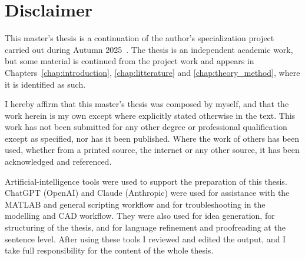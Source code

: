 \chapter*{Disclaimer}
\label{front:discl}

This master's thesis is a continuation of the author's specialization project carried out during Autumn 2025~\cite{Leonsen2025}. The thesis is an independent academic work, but some material is continued from the project work and appears in Chapters~\ref{chap:introduction}, \ref{chap:litterature} and \ref{chap:theory_method}, where it is identified as such.

I hereby affirm that this master's thesis was composed by myself, and that the work herein is my own except where explicitly stated otherwise in the text. This work has not been submitted for any other degree or professional qualification except as specified, nor has it been published. Where the work of others has been used, whether from a printed source, the internet or any other source, it has been acknowledged and referenced.

Artificial-intelligence tools were used to support the preparation of this thesis. ChatGPT (OpenAI) and Claude (Anthropic) were used for assistance with the MATLAB and general scripting workflow and for troubleshooting in the modelling and CAD workflow. They were also used for idea generation, for structuring of the thesis, and for language refinement and proofreading at the sentence level. After using these tools I reviewed and edited the output, and I take full responsibility for the content of the whole thesis.


\clearpage %
